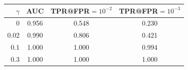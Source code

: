 \begin{tabular}{rccc}
\toprule
$\gamma$ & AUC & TPR@FPR$=10^{-2}$ & TPR@FPR$=10^{-3}$\\
\midrule
0 & 0.956 & 0.548 & 0.230\\
0.02 & 0.990 & 0.806 & 0.421\\
0.1 & 1.000 & 1.000 & 0.994\\
0.3 & 1.000 & 1.000 & 1.000\\
\bottomrule
\end{tabular}
